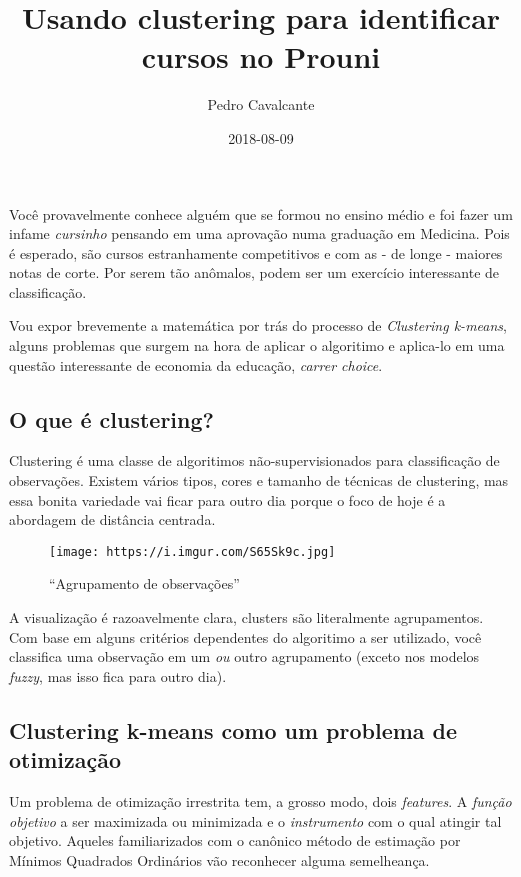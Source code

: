 \documentclass[]{article}
\title{Usando clustering para identificar cursos no Prouni}
\author{Pedro Cavalcante}
\date{2018-08-09}
\begin{document}
\maketitle

Você provavelmente conhece alguém que se formou no ensino médio e foi
fazer um infame \emph{cursinho} pensando em uma aprovação numa graduação
em Medicina. Pois é esperado, são cursos estranhamente competitivos e
com as - de longe - maiores notas de corte. Por serem tão anômalos,
podem ser um exercício interessante de classificação.

Vou expor brevemente a matemática por trás do processo de
\emph{Clustering k-means}, alguns problemas que surgem na hora de
aplicar o algoritimo e aplica-lo em uma questão interessante de economia
da educação, \emph{carrer choice}.

\subsection{O que é clustering?}\label{o-que-e-clustering}

Clustering é uma classe de algoritimos não-supervisionados para
classificação de observações. Existem vários tipos, cores e tamanho de
técnicas de clustering, mas essa bonita variedade vai ficar para outro
dia porque o foco de hoje é a abordagem de distância centrada.

\begin{figure}
\centering
\texttt{[image: https://i.imgur.com/S65Sk9c.jpg]}
\caption{``Agrupamento de observações''}
\end{figure}

A visualização é razoavelmente clara, clusters são literalmente
agrupamentos. Com base em alguns critérios dependentes do algoritimo a
ser utilizado, você classifica uma observação em um \emph{ou} outro
agrupamento (exceto nos modelos \emph{fuzzy}, mas isso fica para outro
dia).

\subsection{Clustering k-means como um problema de
otimização}\label{clustering-k-means-como-um-problema-de-otimizacao}

Um problema de otimização irrestrita tem, a grosso modo, dois
\emph{features}. A \emph{função objetivo} a ser maximizada ou minimizada
e o \emph{instrumento} com o qual atingir tal objetivo. Aqueles
familiarizados com o canônico método de estimação por Mínimos Quadrados
Ordinários vão reconhecer alguma semelheança.
\end{document}
